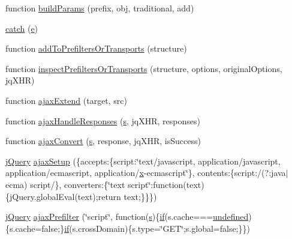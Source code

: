 \begin{DoxyCompactItemize}
\item 
function \hyperlink{_scripts_2jquery-1_810_82_8js_a3c4f3b337daa2444fa73ee856be5f9d8}{build\+Params} (prefix, obj, traditional, add)
\item 
\hyperlink{_scripts_2jquery-1_810_82_8js_a5bf45fc51bc0426586792b5f9cb95431}{catch} (\hyperlink{_scripts_2respond_8min_8js_a2c038346d47955cbe2cb91e338edd7e1}{e})
\item 
function \hyperlink{_scripts_2jquery-1_810_82_8js_ae8bffbac8c6b2208e0ca37b475ec0b70}{add\+To\+Prefilters\+Or\+Transports} (structure)
\item 
function \hyperlink{_scripts_2jquery-1_810_82_8js_ac96b244aea80657fe2d6e3d2c1e8b622}{inspect\+Prefilters\+Or\+Transports} (structure, options, original\+Options, jq\+X\+HR)
\item 
function \hyperlink{_scripts_2jquery-1_810_82_8js_a113ade43cfd5328ebd5ccc84f45fe4de}{ajax\+Extend} (target, src)
\item 
function \hyperlink{_scripts_2jquery-1_810_82_8js_a71c2db7846f21963cee426cb81003c63}{ajax\+Handle\+Responses} (\hyperlink{_scripts_2respond_8min_8js_ad9a7d92cb87932d25187fdec3ba1b621}{s}, jq\+X\+HR, responses)
\item 
function \hyperlink{_scripts_2jquery-1_810_82_8js_a549518271b8708165811ae69c274b58a}{ajax\+Convert} (\hyperlink{_scripts_2respond_8min_8js_ad9a7d92cb87932d25187fdec3ba1b621}{s}, response, jq\+X\+HR, is\+Success)
\item 
\hyperlink{_scripts_2jquery-1_810_82_8js_a41c2e1bff4a6b292938143764e31d789}{j\+Query} \hyperlink{_scripts_2jquery-1_810_82_8js_a52a40924d02e0d9756f051e36a640cd6}{ajax\+Setup} (\{accepts\+:\{script\+:\char`\"{}text/javascript, application/javascript, application/ecmascript, application/\hyperlink{_scripts_2jquery-1_810_82_8min_8js_a5ce50d751c9664d05375c8f5080ed43e}{x}-\/ecmascript\char`\"{}\}, contents\+:\{script\+:/(?\+:java$\vert$ecma) script/\}, converters\+:\{\char`\"{}text script\char`\"{}\+:function(text)\{j\+Query.\+global\+Eval(text);return text;\}\}\})
\item 
\hyperlink{_scripts_2jquery-1_810_82_8js_a41c2e1bff4a6b292938143764e31d789}{j\+Query} \hyperlink{_scripts_2jquery-1_810_82_8js_a144939e373cc1ad511a53c4251ec7ffa}{ajax\+Prefilter} (\char`\"{}script\char`\"{}, function(\hyperlink{_scripts_2respond_8min_8js_ad9a7d92cb87932d25187fdec3ba1b621}{s})\{\hyperlink{_scripts_2respond_8min_8js_a93851d60dd037a83509a1757b9ee7b66}{if}(s.\+cache===\hyperlink{_scripts_2jquery-1_810_82_8js_a08113a236cc18d2a9d5ce27e638012be}{undefined})\{s.\+cache=false;\}\hyperlink{_scripts_2respond_8min_8js_a93851d60dd037a83509a1757b9ee7b66}{if}(s.\+cross\+Domain)\{s.\+type=\char`\"{}G\+ET\char`\"{};s.\+global=false;\}\})

\end{DoxyCompactItemize}
